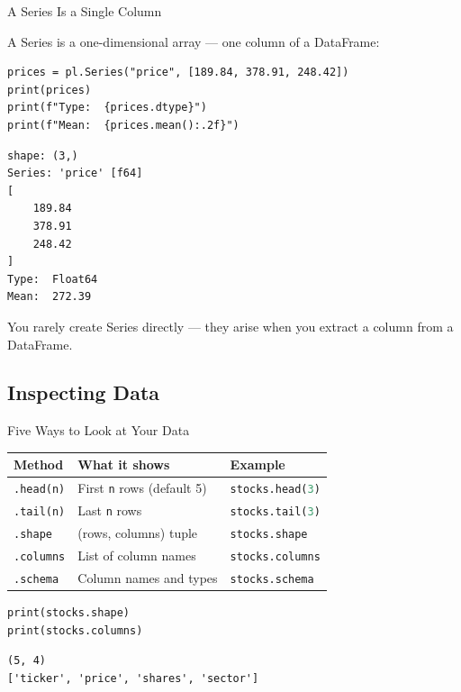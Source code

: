 \documentclass[9pt,aspectratio=169]{beamer}
\newcommand{\py}[1]{\lstinline[language=Python]{#1}}
\begin{document}
\begin{frame}[fragile]{A Series Is a Single Column}

A \alert{Series} is a one-dimensional array --- one column of a DataFrame:

\begin{lstlisting}
prices = pl.Series("price", [189.84, 378.91, 248.42])
print(prices)
print(f"Type:  {prices.dtype}")
print(f"Mean:  {prices.mean():.2f}")
\end{lstlisting}

\begin{lstlisting}[style=output]
shape: (3,)
Series: 'price' [f64]
[
    189.84
    378.91
    248.42
]
Type:  Float64
Mean:  272.39
\end{lstlisting}

You rarely create Series directly --- they arise when you extract a column from a DataFrame.

\end{frame}


\subsection{Inspecting Data}
\begin{frame}[fragile]{Five Ways to Look at Your Data}

\begin{tabular}{@{}lp{5cm}l@{}}
\toprule
\textbf{Method} & \textbf{What it shows} & \textbf{Example} \\
\midrule
\py{.head(n)} & First \texttt{n} rows (default 5) & \py{stocks.head(3)} \\[0.5em]
\py{.tail(n)} & Last \texttt{n} rows & \py{stocks.tail(3)} \\[0.5em]
\py{.shape} & (rows, columns) tuple & \py{stocks.shape} \\[0.5em]
\py{.columns} & List of column names & \py{stocks.columns} \\[0.5em]
\py{.schema} & Column names and types & \py{stocks.schema} \\
\bottomrule
\end{tabular}

\bigskip

\begin{lstlisting}
print(stocks.shape)
print(stocks.columns)
\end{lstlisting}

\begin{lstlisting}[style=output]
(5, 4)
['ticker', 'price', 'shares', 'sector']
\end{lstlisting}

\end{frame}
\end{document}
